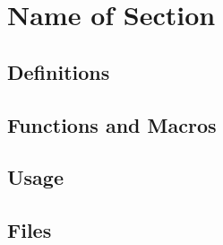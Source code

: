 \section{Name of Section}

\subsection{Definitions}

\subsection{Functions and Macros}

\subsection{Usage}

\subsection{Files}
